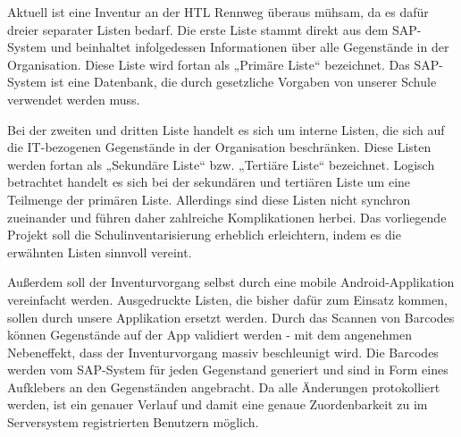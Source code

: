 Aktuell ist eine Inventur an der HTL Rennweg überaus mühsam, da es dafür dreier separater Listen bedarf. Die erste Liste stammt
direkt aus dem SAP-System und beinhaltet infolgedessen Informationen über alle Gegenstände in der Organisation. Diese Liste wird fortan als 
„Primäre Liste“ bezeichnet. Das SAP-System ist eine Datenbank, 
die durch gesetzliche Vorgaben von unserer Schule verwendet werden muss. 

Bei der zweiten und dritten Liste handelt es sich um interne Listen, die sich auf die IT-bezogenen Gegenstände in der Organisation beschränken. 
Diese Listen werden fortan als „Sekundäre Liste“ bzw. „Tertiäre Liste“ bezeichnet. Logisch betrachtet handelt es sich bei der sekundären und 
tertiären Liste um eine Teilmenge der primären Liste.
Allerdings sind diese Listen nicht synchron zueinander und führen daher zahlreiche Komplikationen herbei. 
Das vorliegende Projekt soll die Schulinventarisierung erheblich erleichtern, indem es die erwähnten Listen sinnvoll vereint. 

Außerdem soll der Inventurvorgang selbst durch eine mobile Android-Applikation vereinfacht werden. Ausgedruckte Listen, die bisher dafür zum Einsatz 
kommen, sollen durch unsere Applikation ersetzt werden. Durch das Scannen von Barcodes
können Gegenstände auf der App validiert werden - mit dem angenehmen Nebeneffekt, dass der Inventurvorgang massiv beschleunigt wird. Die Barcodes werden vom SAP-System für jeden Gegenstand generiert 
und sind in Form eines Aufklebers an den Gegenständen angebracht. 
Da alle Änderungen protokolliert werden, ist ein genauer Verlauf und damit eine 
genaue Zuordenbarkeit zu im Serversystem registrierten Benutzern möglich.